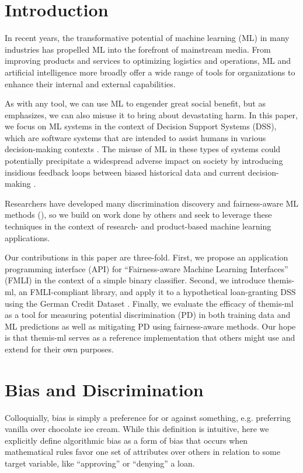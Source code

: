 \documentclass{interact}
\begin{document}
\section{Introduction} In recent years, the transformative potential of machine
learning (ML) in many industries has propelled ML into the forefront of
mainstream media. From improving products and services to optimizing logistics
and operations, ML and artificial intelligence more broadly offer a wide range
of tools for organizations to enhance their internal and external capabilities.

As with any tool, we can use ML to engender great social benefit, but as
\citet{o2017weapons} emphasizes, we can also misuse it to bring about devastating
harm. In this paper, we focus on ML systems in the context of Decision Support
Systems (DSS), which are software systems that are intended to assist humans in
various decision-making contexts \cite{yoshimura2006decision,
montgomery2000evaluation, barnett1987dxplain, mysiak2005towards}. The misuse of
ML in these types of systems could potentially precipitate a widespread adverse
impact on society by introducing insidious feedback loops between biased
historical data and current decision-making \cite{o2017weapons}.

Researchers have developed many discrimination discovery and fairness-aware ML
methods (\citealp{kusner2017counterfactual, kamiran2012data, kamishima2012fairness,
kamiran2012decision, zemel2013learning, zafar2017fairness, dwork2012fairness,
zliobaite2015survey}), so we build on work done by others and seek to leverage
these techniques in the context of research- and product-based machine learning
applications.

Our contributions in this paper are three-fold. First, we propose an application
programming interface (API) for ``Fairness-aware Machine Learning Interfaces''
(FMLI) in the context of a simple binary classifier. Second, we introduce
themis-ml, an FMLI-compliant library, and apply it to a hypothetical
loan-granting DSS using the German Credit Dataset \cite{bache2013uci}. Finally, we
evaluate the efficacy of themis-ml as a tool for measuring potential
discrimination (PD) in both training data and ML predictions as well as
mitigating PD using fairness-aware methods. Our hope is that themis-ml serves as
a reference implementation that others might use and extend for their own
purposes.

\section{Bias and Discrimination}
Colloquially, bias is simply a preference for or against something, e.g.
preferring vanilla over chocolate ice cream. While this definition is
intuitive, here we explicitly define algorithmic bias as a form of bias that
occurs when mathematical rules favor one set of attributes over others in
relation to some target variable, like ``approving'' or ``denying'' a loan.
\end{document}
